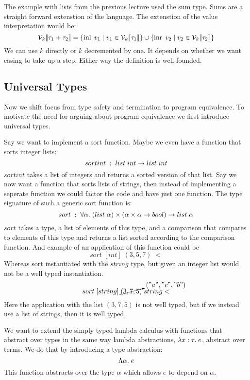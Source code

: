 The example with lists from the previous lecture used the sum type. Sums are a straight forward extenstion of the language. The extenstion of the value interpretation would be:
\[
  \mathcal{V}_{k}\llbracket \tau_1 + \tau_2 \rrbracket = \{\operatorname{inl} \; v_1 \; | \; v_1 \in \mathcal{V}_{k}\llbracket \tau_1 \rrbracket\} \cup 
                            \{\operatorname{inr} \; v_2 \; | \; v_2 \in \mathcal{V}_{k}\llbracket \tau_2 \rrbracket\}
\]
We can use $k$ directly or $k$ decremented by one. It depends on whether we want casing to take up a step. Either way the definition is well-founded. 

\subsection*{Universal Types}
Now we shift focus from type safety and termination to program equivalence. To motivate the need for arguing about program equivalence we first introduce universal types.

Say we want to implement a sort function. Maybe we even have a function that sorts integer lists:
\[
  sortint \; : \;  list \; int \rightarrow list \; int
\]
$sortint$ takes a list of integers and returns a sorted version of that list. Say we now want a function that sorts lists of strings, then instead of implementing a seperate function we could factor the code and have just one function. The type signature of such a generic sort function is:
\[
  sort \; : \; \forall \alpha.\;  (list \; \alpha) \times ( \alpha \times \alpha \rightarrow bool ) \rightarrow list \; \alpha
\]
$sort$ takes a type, a list of elements of this type, and a comparison that compares to elements of this type and returns a list sorted according to the comparison function. And example of an application of this function could be
\[
  sort \; [int] \; (3,5,7) \; <
\]
Whereas sort instantiated with the $string$ type, but given an integer list would not be a well typed instantiation.
\[
  sort \; [string] \; \cancelto{("a","c","b")}{(3,7,5)} \; string<
\]
Here the application with the list $(3,7,5)$ is not well typed, but if we instead use a list of strings, then it is well typed. 

We want to extend the simply typed lambda calculus with functions that abstract over types in the same way lambda abstractions, $\lambda x : \tau . \; e$, abstract over terms. We do that by introducing a type abstraction:
\[
  \Lambda \alpha . \; e
\]
This function abstracts over the type $\alpha$ which allows $e$ to depend on $\alpha$.

